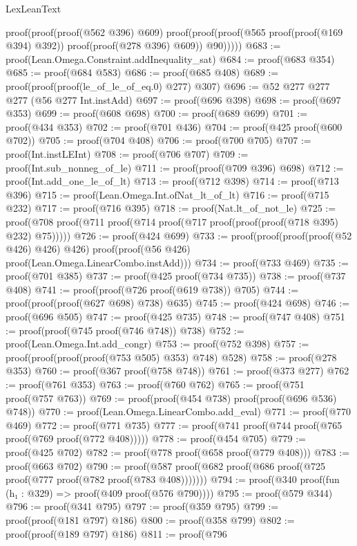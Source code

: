 \begin{lexlean}{LexLeanText}
\begin{coremodule}
              proof(proof(proof(@562 @396) @609)
                  proof(proof(proof(@565 proof(proof(@169 @394) @392)) proof(proof(@278 @396) @609))
                      @90)))))
@683 := proof(Lean.Omega.Constraint.addInequality_sat)
@684 := proof(@683 @354)
@685 := proof(@684 @583)
@686 := proof(@685 @408)
@689 := proof(proof(proof(le_of_le_of_eq.{0}) @277) @307)
@696 := @52 @277 @277 @277 (@56 @277 Int.instAdd)
@697 := proof(@696 @398)
@698 := proof(@697 @353)
@699 := proof(@608 @698)
@700 := proof(@689 @699)
@701 := proof(@434 @353)
@702 := proof(@701 @436)
@704 := proof(@425 proof(@600 @702))
@705 := proof(@704 @408)
@706 := proof(@700 @705)
@707 := proof(Int.instLEInt)
@708 := proof(@706 @707)
@709 := proof(Int.sub_nonneg_of_le)
@711 := proof(proof(@709 @396) @698)
@712 := proof(Int.add_one_le_of_lt)
@713 := proof(@712 @398)
@714 := proof(@713 @396)
@715 := proof(Lean.Omega.Int.ofNat_lt_of_lt)
@716 := proof(@715 @232)
@717 := proof(@716 @395)
@718 := proof(Nat.lt_of_not_le)
@725 := proof(@708 proof(@711 proof(@714 proof(@717 proof(proof(proof(@718 @395) @232) @75)))))
@726 := proof(@424 @699)
@733 := proof(proof(proof(proof(@52 @426) @426) @426)
      proof(proof(@56 @426) proof(Lean.Omega.LinearCombo.instAdd)))
@734 := proof(@733 @469)
@735 := proof(@701 @385)
@737 := proof(@425 proof(@734 @735))
@738 := proof(@737 @408)
@741 := proof(proof(@726 proof(@619 @738)) @705)
@744 := proof(proof(proof(@627 @698) @738) @635)
@745 := proof(@424 @698)
@746 := proof(@696 @505)
@747 := proof(@425 @735)
@748 := proof(@747 @408)
@751 := proof(proof(@745 proof(@746 @748)) @738)
@752 := proof(Lean.Omega.Int.add_congr)
@753 := proof(@752 @398)
@757 := proof(proof(proof(proof(@753 @505) @353) @748) @528)
@758 := proof(@278 @353)
@760 := proof(@367 proof(@758 @748))
@761 := proof(@373 @277)
@762 := proof(@761 @353)
@763 := proof(@760 @762)
@765 := proof(@751 proof(@757 @763))
@769 := proof(proof(@454 @738) proof(proof(@696 @536) @748))
@770 := proof(Lean.Omega.LinearCombo.add_eval)
@771 := proof(@770 @469)
@772 := proof(@771 @735)
@777 := proof(@741 proof(@744 proof(@765 proof(@769 proof(@772 @408)))))
@778 := proof(@454 @705)
@779 := proof(@425 @702)
@782 := proof(@778 proof(@658 proof(@779 @408)))
@783 := proof(@663 @702)
@790 := proof(@587 proof(@682 proof(@686 proof(@725 proof(@777 proof(@782 proof(@783 @408)))))))
@794 := proof(@340 proof(fun (h₁ : @329) => proof(@409 proof(@576 @790))))
@795 := proof(@579 @344)
@796 := proof(@341 @795)
@797 := proof(@359 @795)
@799 := proof(proof(@181 @797) @186)
@800 := proof(@358 @799)
@802 := proof(proof(@189 @797) @186)
@811 := proof(@796

\end{coremodule}
\end{lexlean}
